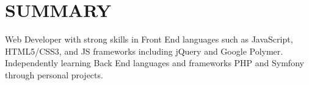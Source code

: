 \documentclass[]{deedy-resume-openfont}
\begin{document}
%
%

%
%



\vspace{5mm}

%
%

\section{SUMMARY}
\begin{flushleft}
Web Developer with strong skills in Front End languages such as JavaScript, HTML5/CSS3, and JS frameworks including jQuery and Google Polymer. Independently learning Back End languages and frameworks PHP and Symfony through personal projects. 
\end{flushleft}
\vspace*{-3mm}
\end{document}
